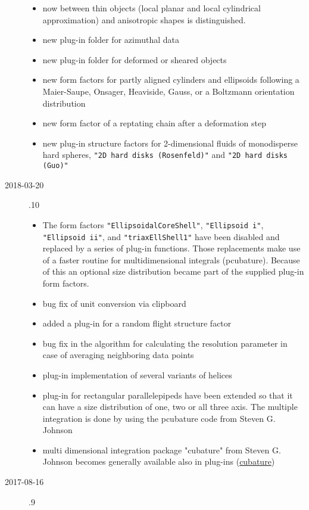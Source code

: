 \begin{description}
\begin{itemize}
    \item now between thin objects (local planar and local cylindrical approximation) and anisotropic shapes is distinguished.
    \item new plug-in folder for azimuthal data
    \item new plug-in folder for deformed or sheared objects
    \item new form factors for partly aligned cylinders and ellipsoids following a Maier-Saupe, Onsager, Heaviside, Gauss, or a Boltzmann orientation distribution
    \item new form factor of a reptating chain after a deformation step
    \item new plug-in structure factors for 2-dimensional fluids of monodisperse hard spheres, \texttt{"2D hard disks (Rosenfeld)"} and \texttt{"2D hard disks (Guo)"}
    \end{itemize}
\item[2018-03-20] .10
    \begin{itemize}
    \item The form factors \texttt{"EllipsoidalCoreShell"}, \texttt{"Ellipsoid i"}, \texttt{"Ellipsoid ii"}, and \texttt{"triaxEllShell1"} have been disabled and replaced by a series of plug-in functions. Those replacements make use of a faster routine for multidimensional integrals (pcubature). Because of this an optional size distribution became part of the supplied plug-in form factors.
    \item bug fix of unit conversion via clipboard
    \item added a plug-in for a random flight structure factor
    \item bug fix in the algorithm for calculating the resolution parameter in case of averaging neighboring data points
    \item  plug-in implementation of several variants of helices
    \item plug-in for rectangular parallelepipeds have been extended so that it can have a size distribution of one, two or all three axis. The multiple integration is done by using the pcubature code from  Steven G. Johnson
    \item multi dimensional integration package "cubature" from  Steven G. Johnson becomes generally available also in plug-ins (\href{https://github.com/stevengj/cubature}{cubature})
    \end{itemize}
\item[2017-08-16] .9
    \begin{itemize}

\end{itemize}
\end{description}
